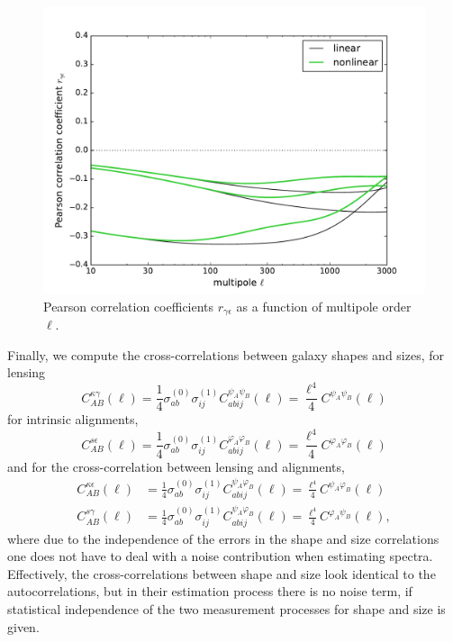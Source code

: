 \documentclass[a4paper,fleqn,usenatbib]{mnras}
\begin{document}
\begin{figure}
\centering
\includegraphics[scale=0.45]{./figures/pearson_coefficient.pdf}
\caption{Pearson correlation coefficients $r_{\gamma\epsilon}$ as a function of multipole order $\ell$.}
\label{fig:pearson}
\end{figure}

Finally, we compute the cross-correlations between galaxy shapes and sizes, for lensing
\begin{equation}
C_{AB}^{\kappa\gamma}(\ell) = \frac{1}{4}\sigma^{(0)}_{ab}\sigma^{(1)}_{ij}C^{\psi_A\psi_B}_{abij}(\ell) = \frac{\ell^4}{4}C^{\psi_A\psi_B}(\ell)
\end{equation}
for intrinsic alignments,
\begin{equation}
C_{AB}^{s\epsilon}(\ell) = \frac{1}{4}\sigma^{(0)}_{ab}\sigma^{(1)}_{ij}C^{\varphi_A\varphi_B}_{abij}(\ell) = \frac{\ell^4}{4}C^{\varphi_A\varphi_B}(\ell)
\end{equation}
and for the cross-correlation between lensing and alignments,
\begin{align}
C_{AB}^{\kappa\epsilon}(\ell) & = \frac{1}{4}\sigma^{(0)}_{ab}\sigma^{(1)}_{ij}C^{\psi_A\varphi_B}_{abij}(\ell) = \frac{\ell^4}{4}C^{\psi_A\varphi_B}(\ell)\\
C_{AB}^{s\gamma}(\ell) & = \frac{1}{4}\sigma^{(0)}_{ab}\sigma^{(1)}_{ij}C^{\psi_A\varphi_B}_{abij}(\ell) = \frac{\ell^4}{4}C^{\varphi_A\psi_B}(\ell),
\end{align}
where due to the independence of the errors in the shape and size correlations one does not have to deal with a noise contribution when estimating spectra. Effectively, the cross-correlations between shape and size look identical to the autocorrelations, but in their estimation process there is no noise term, if statistical independence of the two measurement processes for shape and size is given.
\end{document}
